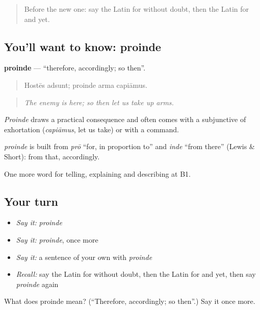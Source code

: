 \begin{quote}
Before the new one: say the Latin for without doubt, then the Latin for and yet.
\end{quote}

\subsection*{You'll want to know: proinde}
\textbf{proinde} — \textquotedblleft{}therefore, accordingly; so then\textquotedblright{}.

\begin{quote}
Hostēs adsunt; proinde arma capiāmus.
\end{quote}

\begin{quote}
\emph{The enemy is here; so then let us take up arms.}
\end{quote}

\emph{Proinde} draws a practical consequence and often comes with a subjunctive of exhortation (\emph{capiāmus}, let us take) or with a command.

\begin{cousinweb}
\emph{proinde} is built from \emph{prō} \textquotedblleft{}for, in proportion to\textquotedblright{} and \emph{inde} \textquotedblleft{}from there\textquotedblright{} (Lewis \& Short): from that, accordingly.
\end{cousinweb}

\begin{grammarlens}[title={What you've built}]
One more word for telling, explaining and describing at B1.
\end{grammarlens}

\subsection*{Your turn}
\begin{itemize}
\raggedright
  \item \emph{Say it:} \emph{proinde}
  \item \emph{Say it:} \emph{proinde}, once more
  \item \emph{Say it:} a sentence of your own with \emph{proinde}
  \item \emph{Recall:} say the Latin for without doubt, then the Latin for and yet, then say \emph{proinde} again
\end{itemize}

\begin{tcolorbox}[breakable,colback=teal!4,colframe=teal!35!black,title={Before you move on}]
What does proinde mean? (\textquotedblleft{}Therefore, accordingly; so then\textquotedblright{}.) Say it once more.
\end{tcolorbox}
